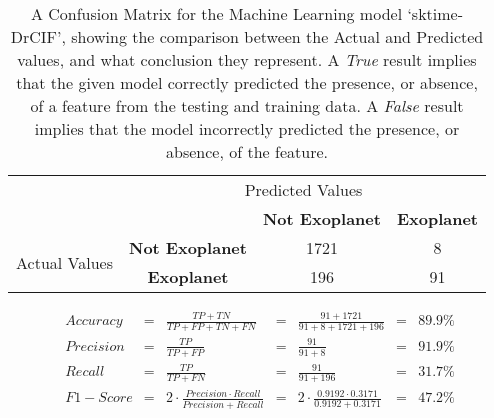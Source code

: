 
    \renewcommand{\arraystretch}{2}
    \renewcommand{\tabcolsep}{20.25pt}
    \vspace{-0.5cm}
    \begin{table}[ht]
    \begin{tabular}{cccc}
     & \multicolumn{3}{c}{Predicted Values} \\ \cline{3-4}
     & \multicolumn{1}{c|}{} & \multicolumn{1}{c|}{\textbf{Not Exoplanet}} & \multicolumn{1}{c|}{\textbf{Exoplanet}} \\ \cline{2-4}
    \multicolumn{1}{c|}{\multirow{2}{2.0cm}{Actual Values}} & \multicolumn{1}{c|}{\textbf{Not Exoplanet}} & \multicolumn{1}{c|}{1721} & \multicolumn{1}{c|}{8} \\ \cline{2-4}
    \multicolumn{1}{c|}{} & \multicolumn{1}{c|}{\textbf{Exoplanet}} & \multicolumn{1}{c|}{196} & \multicolumn{1}{c|}{91} \\ \cline{2-4}
    \end{tabular}
    \caption{A Confusion Matrix for the Machine Learning model `sktime-DrCIF', showing the comparison between the Actual and Predicted values, and what conclusion they represent. A \emph{True} result implies that the given model correctly predicted the presence, or absence, of a feature from the testing and training data. A \emph{False} result implies that the model incorrectly predicted the presence, or absence, of the feature.}
    \label{tab:sktime-DrCIFconfusionmatrix}
    \end{table}
    \vspace{-0.75cm}
    \label{eq:metrics-sktime-DrCIF}
    \begin{align*}
        Accuracy &= &\frac{TP + TN}{TP + FP + TN + FN} &= &\frac{91 + 1721}{91 + 8 + 1721 + 196} &= & 89.9\% \\
        Precision &= &\frac{TP}{TP + FP} &= &\frac{91}{91 + 8} &= & 91.9\% \\
        Recall &= &\frac{TP}{TP + FN} &= &\frac{91}{91 + 196} &= & 31.7\% \\
        F1-Score &= &2 \cdot \frac{Precision \cdot Recall}{Precision + Recall} &= &2 \cdot \frac{0.9192 \cdot 0.3171}{0.9192 + 0.3171} &= & 47.2\% \\
    \end{align*}
    \vspace{-1.75cm}
    \renewcommand{\arraystretch}{1}
    \renewcommand{\tabcolsep}{5.25pt}
    